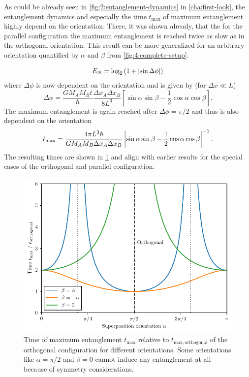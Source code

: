 As could be already seen in \cref{fig:2:entanglement-dynamics} in \cref{cha:first-look}, the entanglement dynamics and especially the time $t_\mathrm{max}$ of maximum entanglement highly depend on the orientation.
There, it was shown already, that the for the parallel configuration the maximum entanglement is reached twice as slow as in the orthogonal orientation.
This result can be more generalized for an arbitrary orientation quantified by $\alpha$ and $\beta$ from \cref{fig:4:complete-setup}.


\begin{equation}
  E_N = \log_2\left(1 + \left\lvert\sin\Delta \phi\right\rvert\right)
\end{equation}
where $\Delta \phi$ is now dependent on the orientation and is given by (for $\Delta x \ll L$)
\begin{equation}
  \Delta \phi = \frac{G M_A M_B t}{\hbar}\frac{\Delta x_A \Delta x_B}{8 L^3} \left[\sin\alpha\sin\beta - \frac{1}{2}\cos\alpha\cos\beta\right] .
\end{equation}
The maximum entanglement is again reached after $\Delta\phi = \pi/2$ and thus is also dependent on the orientation
\begin{equation}\label{eq:4:t-max}
  t_\mathrm{max} = \frac{4\pi L^3\hbar}{GM_AM_B\Delta x_A \Delta x_B} \left\lvert\sin\alpha\sin\beta - \frac{1}{2}\cos\alpha\cos\beta\right\rvert^{-1}.
\end{equation}
The resulting times are shown in \cref{fig:4:t-max-orientation} and align with earlier results for the special cases of the orthogonal and parallel configuration.
\begin{figure}[!htbp]
  \centering
  \includegraphics[width=\textwidth]{./../figures/ideal-entanglement/EN-orientation.pdf}
  \caption{Time of maximum entanglement $t_\mathrm{max}$ relative to $t_\mathrm{max,orthogonal}$ of the orthogonal configuration for different orientations. Some orientations like $\alpha=\pi/2$ and $\beta=0$ cannot induce any entanglement at all because of symmetry considerations.}
  \label{fig:4:t-max-orientation}
\end{figure}
